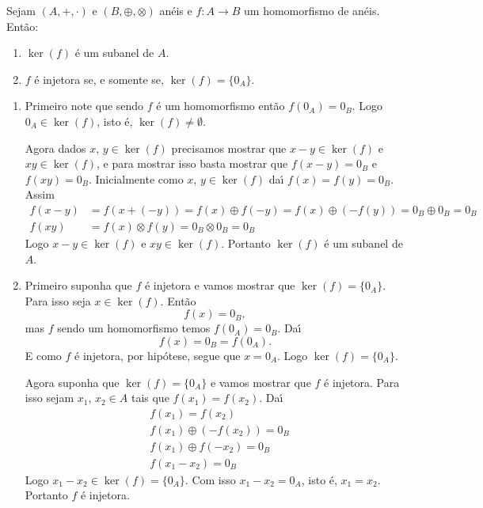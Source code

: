 \begin{proposicao}
	Sejam $(A, +, \cdot)$ e $(B, \oplus, \otimes)$ an\'eis e $f : A \to B$ um homomorfismo de an\'eis. Ent\~ao:
	\begin{enumerate}[label={\roman*})]
		\item $\ker(f)$ \'e um subanel de $A$.
		\item $f$ \'e injetora se, e somente se, $\ker(f) = \{0_A\}$.
	\end{enumerate}
\end{proposicao}
\begin{prova}
	\begin{enumerate}[label={\roman*})]
		\item Primeiro note que sendo $f$ \'e um homomorfismo ent\~ao $f(0_A) = 0_B$. Logo $0_A \in \ker(f)$, isto \'e, $\ker(f) \ne \emptyset$.

		Agora dados $x$, $y \in \ker(f)$ precisamos mostrar que $x - y \in \ker(f)$ e $xy \in \ker(f)$, e para mostrar isso basta mostrar que $f(x - y) = 0_B$ e$f(xy) = 0_B$. Inicialmente como $x$, $y \in \ker(f)$ da{\'\i} $f(x) = f(y) = 0_B$. Assim
		\begin{align*}
			f(x - y) &= f(x + (-y)) = f(x) \oplus f(-y) = f(x) \oplus (-f(y)) = 0_B \oplus 0_B = 0_B\\
			f(xy) &= f(x)\otimes f(y) = 0_B \otimes 0_B = 0_B
		\end{align*}
		Logo $x - y \in \ker(f)$ e $xy \in \ker(f)$. Portanto $\ker(f)$ \'e um subanel de $A$.

		\item Primeiro suponha que $f$ \'e injetora e vamos mostrar que $\ker(f) = \{0_A\}$. Para isso seja $x \in \ker(f)$. Ent\~ao
		\[
			f(x) = 0_B,
		\]
		mas $f$ sendo um homomorfismo temos $f(0_A) = 0_B$. Da{\'\i}
		\[
			f(x) = 0_B = f(0_A).
		\]
		E como $f$ \'e injetora, por hip\'otese, segue que $x = 0_A$. Logo $\ker(f) = \{0_A\}$.

		Agora suponha que $\ker(f) = \{0_A\}$ e vamos mostrar que $f$ \'e injetora. Para isso sejam $x_1$, $x_2 \in A$ tais que $f(x_1) = f(x_2)$. Da{\'\i}
		\begin{align*}
			&f(x_1) = f(x_2)\\
			&f(x_1) \oplus (-f(x_2)) = 0_B\\
			&f(x_1) \oplus f(-x_2) = 0_B\\
			&f(x_1 - x_2) = 0_B
		\end{align*}
		Logo $x_1 - x_2 \in \ker(f) = \{0_A\}$. Com isso $x_1 - x_2 = 0_A$, isto \'e, $x_1 = x_2$. Portanto $f$ \'e injetora.
	\end{enumerate}
\end{prova}



